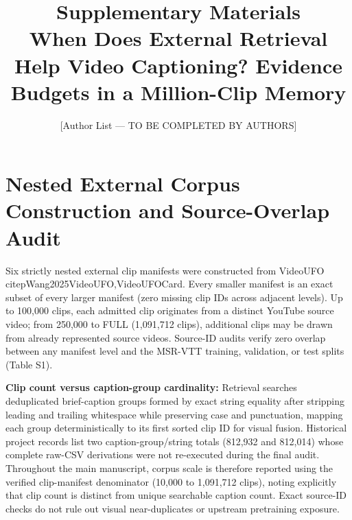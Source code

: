 \documentclass[11pt,a4paper]{article}
\title{\textbf{Supplementary Materials}\\[4pt]\large When Does External Retrieval Help Video Captioning? Evidence Budgets in a Million-Clip Memory}
\author{[Author List --- TO BE COMPLETED BY AUTHORS]}
\date{}
\begin{document}
\maketitle

\section{Nested External Corpus Construction and Source-Overlap Audit}
Six strictly nested external clip manifests were constructed from VideoUFO \\citep{Wang2025VideoUFO,VideoUFOCard}. Every smaller manifest is an exact subset of every larger manifest (zero missing clip IDs across adjacent levels). Up to 100,000 clips, each admitted clip originates from a distinct YouTube source video; from 250,000 to FULL (1,091,712 clips), additional clips may be drawn from already represented source videos. Source-ID audits verify zero overlap between any manifest level and the MSR-VTT training, validation, or test splits (Table S1).

\begin{table}[t]
\centering
\footnotesize
\caption{Verified clip counts, unique source-video counts, nesting integrity, and source-ID overlap with MSR-VTT across the six nested VideoUFO manifests.}
\label{tab:s1}
\end{table}

\textbf{Clip count versus caption-group cardinality:} Retrieval searches deduplicated brief-caption groups formed by exact string equality after stripping leading and trailing whitespace while preserving case and punctuation, mapping each group deterministically to its first sorted clip ID for visual fusion. Historical project records list two caption-group/string totals (812,932 and 812,014) whose complete raw-CSV derivations were not re-executed during the final audit. Throughout the main manuscript, corpus scale is therefore reported using the verified clip-manifest denominator (10,000 to 1,091,712 clips), noting explicitly that clip count is distinct from unique searchable caption count. Exact source-ID checks do not rule out visual near-duplicates or upstream pretraining exposure.
\end{document}
